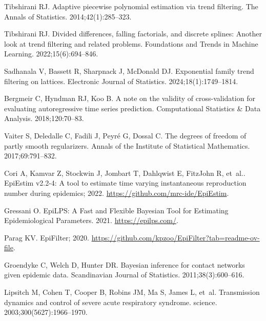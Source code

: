 \documentclass[10pt,letterpaper]{article}
\begin{document}
\begin{thebibliography}{10}
  Tibshirani RJ.
  \newblock Adaptive piecewise polynomial estimation via trend filtering.
  \newblock The Annals of Statistics. 2014;42(1):285--323.
  
  Tibshirani RJ.
  \newblock Divided differences, falling factorials, and discrete splines:
    Another look at trend filtering and related problems.
  \newblock Foundations and Trends in Machine Learning.
    2022;15(6):694--846.
  
  Sadhanala V, Bassett R, Sharpnack J, McDonald DJ.
  \newblock Exponential family trend filtering on lattices.
  \newblock Electronic Journal of Statistics. 2024;18(1):1749--1814.
  
  Bergmeir C, Hyndman RJ, Koo B.
  \newblock A note on the validity of cross-validation for evaluating
    autoregressive time series prediction.
  \newblock Computational Statistics \& Data Analysis. 2018;120:70--83.
  
  Vaiter S, Deledalle C, Fadili J, Peyr{\'e} G, Dossal C.
  \newblock The degrees of freedom of partly smooth regularizers.
  \newblock Annals of the Institute of Statistical Mathematics. 2017;69:791--832.
  
  Cori A, Kamvar Z, Stockwin J, Jombart T, Dahlqwist E, FitzJohn R, et~al..
    {EpiEstim v2.2-4: A tool to estimate time varying instantaneous reproduction
    number during epidemics}; 2022.
  \newblock \url{https://github.com/mrc-ide/EpiEstim}.
  
  Gressani O. {EpiLPS: {A} {F}ast and {F}lexible {B}ayesian {T}ool for
    {E}stimating {E}pidemiological {P}arameters.} 2021.
  \newblock \url{https://epilps.com/}.
  
  Parag KV. {EpiFilter}; 2020.
  \newblock \url{https://github.com/kpzoo/EpiFilter?tab=readme-ov-file}.
  
  Groendyke C, Welch D, Hunter DR.
  \newblock Bayesian inference for contact networks given epidemic data.
  \newblock Scandinavian Journal of Statistics. 2011;38(3):600--616.
  
  Lipsitch M, Cohen T, Cooper B, Robins JM, Ma S, James L, et~al.
  \newblock Transmission dynamics and control of severe acute respiratory
    syndrome.
  \newblock science. 2003;300(5627):1966--1970.
  

\end{thebibliography}
\end{document}

